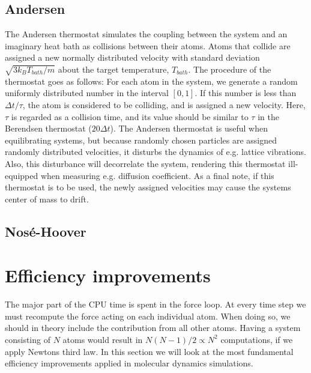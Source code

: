 \documentclass[twoside,english]{uiofysmaster}
\begin{document}
\subsection{Andersen}
The Andersen thermostat simulates the coupling between the system and an imaginary heat bath as collisions between their atoms. 
Atoms that collide are assigned a new normally distributed velocity with standard deviation  $\sqrt{3k_BT_{bath}/m}$ about the target temperature, $T_{bath}$.
The procedure of the thermostat goes as follows:
For each atom in the system, we generate a random uniformly distributed number in the interval $[0,1]$. 
If this number is less than $\Delta t/\tau$, the atom is considered to be colliding, and is assigned a new velocity. 
Here, $\tau$ is regarded as a collision time, and its value should be similar to $\tau$ in the Berendsen thermostat ($20\Delta t$). 
The Andersen thermostat is useful when equilibrating systems, but because randomly chosen particles are assigned randomly distributed velocities, it disturbs the dynamics of e.g. lattice vibrations. 
Also, this disturbance will decorrelate the system, rendering this thermostat ill-equipped when measuring e.g. diffusion coefficient.  
As a final note, if this thermostat is to be used, the newly assigned velocities may cause the systems center of mass to drift.


\subsection{Nosé-Hoover}



\section{Efficiency improvements}
The major part of the CPU time is spent in the force loop. 
At every time step we must recompute the force acting on each individual atom. 
When doing so, we should in theory include the contribution from all other atoms. 
Having a system consisting of $N$ atoms would result in $N(N-1)/2 \propto N^2$ computations, if we apply Newtons third law.
In this section we will look at the most fundamental efficiency improvements applied in molecular dynamics simulations.
\end{document}
